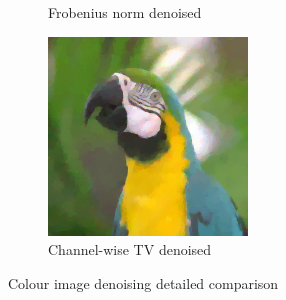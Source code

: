 \documentclass{article}
\begin{document}
\begin{figure}[ht]
\begin{subfigure}[b]{0.24\textwidth}
        \caption{Frobenius norm denoised}
        \label{fig:ZoomedFrobeniusNormdenoised_colour}
    \end{subfigure}
    \begin{subfigure}[b]{0.24\textwidth}
        \centering
        \includegraphics[scale=2.5,trim={80 117 78 45},clip=true]{images/ChannelwiseTVdenoised_colour.png}
        \caption{Channel-wise TV denoised}
        \label{fig:ZoomedChannelwiseTVdenoised_colour}
    \end{subfigure}
    \vspace{.3cm}

    \caption{Colour image denoising detailed comparison}
    \label{fig:colour_comparison_zoomed}
\end{figure}



 \label{bib}
\end{document}
